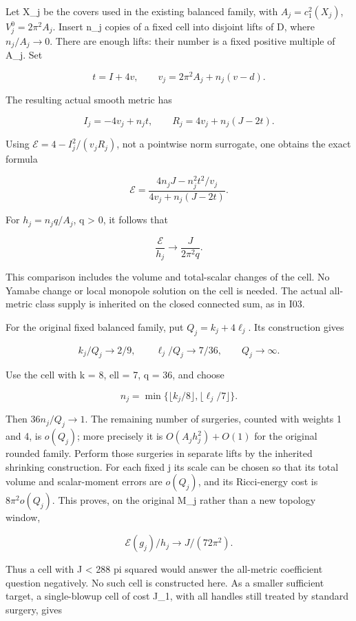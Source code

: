 \documentclass[
  10pt,
]{article}
\begin{document}
Let X\_j be the covers used in the existing balanced family, with
\(A_j=c_1^2(X_j)\), \(V_j^0=2\pi^2A_j\). Insert n\_j copies of a fixed
cell into disjoint lifts of D, where \(n_j/A_j\to0\). There are enough
lifts: their number is a fixed positive multiple of A\_j. Set

\[
 t=I+4v,\qquad v_j=2\pi^2A_j+n_j(v-d).
\]

The resulting actual smooth metric has

\[
 I_j=-4v_j+n_jt,\qquad
 R_j=4v_j+n_j(J-2t).
\]

Using \(\mathcal E=4-I_j^2/(v_jR_j)\), not a pointwise norm surrogate,
one obtains the exact formula

\[
 \boxed{\mathcal E
   =\frac{4n_jJ-n_j^2t^2/v_j}{4v_j+n_j(J-2t)}.}            \tag{2.1}
\]

For \(h_j=n_jq/A_j\), q \textgreater{} 0, it follows that

\[
             \frac{\mathcal E}{h_j}\longrightarrow
                         \frac{J}{2\pi^2q}.              \tag{2.2}
\]

This comparison includes the volume and total-scalar changes of the
cell. No Yamabe change or local monopole solution on the cell is needed.
The actual all-metric class supply is inherited on the closed connected
sum, as in I03.

For the original fixed balanced family, put \(Q_j=k_j+4\ell_j\). Its
construction gives

\[
 k_j/Q_j\to2/9,\qquad \ell_j/Q_j\to7/36,\qquad Q_j\to\infty.
\]

Use the cell with k = 8, ell = 7, q = 36, and choose

\[
 n_j=\min\{\lfloor k_j/8\rfloor,\lfloor\ell_j/7\rfloor\}.
\]

Then \(36n_j/Q_j\to1\). The remaining number of surgeries, counted with
weights 1 and 4, is \(o(Q_j)\); more precisely it is
\(O(A_jh_j^2)+O(1)\) for the original rounded family. Perform those
surgeries in separate lifts by the inherited shrinking construction. For
each fixed j its scale can be chosen so that its total volume and
scalar-moment errors are \(o(Q_j)\), and its Ricci-energy cost is
\(8\pi^2o(Q_j)\). This proves, on the original M\_j rather than a new
topology window,

\[
 \boxed{\mathcal E(g_j)/h_j\to J/(72\pi^2).}               \tag{2.3}
\]

Thus a cell with J \textless{} 288 pi squared would answer the
all-metric coefficient question negatively. No such cell is constructed
here. As a smaller sufficient target, a single-blowup cell of cost J\_1,
with all handles still treated by standard surgery, gives
\end{document}
